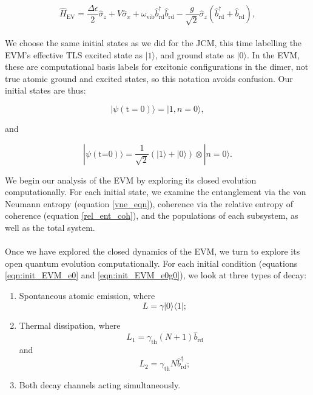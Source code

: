 \documentclass[12pt]{article}
\begin{document}
\begin{equation*}
    \hat{H}_{\scriptscriptstyle \text{EV}} = \frac{\Delta\epsilon}{2}\hat{\sigma}_z + V\hat{\sigma}_x + \omega_{\scriptscriptstyle \text{vib}} \hat{b}_{\scriptscriptstyle \text{rd}}^\dagger \hat{b}_{\scriptscriptstyle \text{rd}} -\frac{g}{\sqrt{2}}\hat{\sigma}_z\left(\hat{b}_{\scriptscriptstyle \text{rd}}^\dagger + \hat{b}_{\scriptscriptstyle \text{rd}}\right),
\end{equation*}
\\
We choose the same initial states as we did for the JCM, this time labelling the EVM's effective TLS excited state as $|1\rangle$, and ground state as $|0\rangle$. In the EVM, these are computational basis labels for excitonic configurations in the dimer, not true atomic ground and excited states, so this notation avoids confusion. Our initial states are thus:

\begin{equation} \label{eqn:init_EVM_e0}
    |\psi (\text{t}=0)\rangle = |1,n=0\rangle,
\end{equation}

and 

\begin{equation}\label{eqn:init_EVM_e0g0}
    |\psi (\text{t=0})\rangle = \frac{1}{\sqrt{2}}(|1\rangle + |0\rangle)\otimes|n=0\rangle.
\end{equation}

We begin our analysis of the EVM by exploring its closed evolution computationally. For each initial state, we examine the entanglement via the von Neumann entropy (equation \eqref{vne_eqn}), coherence via the relative entropy of coherence (equation \eqref{rel_ent_coh}), and the populations of each subsystem, as well as the total system.\\
\\
Once we have explored the closed dynamics of the EVM, we turn to explore its open quantum evolution computationally. For each initial condition (equations \eqref{eqn:init_EVM_e0} and \eqref{eqn:init_EVM_e0g0}), we look at three types of decay:

\begin{enumerate}
    \item Spontaneous atomic emission, where 
    \begin{equation*}
        L = \gamma|0\rangle\langle1|;
    \end{equation*}
    \item Thermal dissipation, where
    \begin{equation*}
        L_1 = \gamma_{\scriptscriptstyle \text{th}}(N+1)\hat{b}_{\scriptscriptstyle\text{rd}} 
    \end{equation*}
    and 
    \begin{equation*}
        L_2 = \gamma_{\scriptscriptstyle \text{th}}N\hat{b}_{\scriptscriptstyle\text{rd}} ^\dagger;
    \end{equation*}
    \item Both decay channels acting simultaneously.
\end{enumerate}
\end{document}
